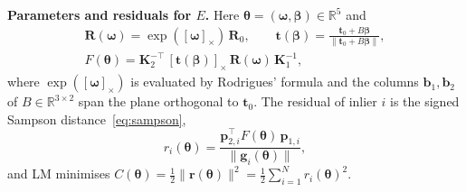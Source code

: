 \documentclass[10pt,a4paper,twocolumn]{article}
\newcommand{\R}{\mathbf{R}}
\newcommand{\tv}{\mathbf{t}}
\newcommand{\K}{\mathbf{K}}
\begin{document}
\textbf{Parameters and residuals for $E$.} Here $\boldsymbol\theta=(\boldsymbol\omega,\boldsymbol\beta)\in\mathbb{R}^5$ and
\begin{gather}
  \R(\boldsymbol\omega)=\exp([\boldsymbol\omega]_\times)\,\R_0,\qquad \tv(\boldsymbol\beta)=\frac{\tv_0+B\boldsymbol\beta}{\|\tv_0+B\boldsymbol\beta\|},\\
  F(\boldsymbol\theta)=\K_2^{-\top}\,[\tv(\boldsymbol\beta)]_\times\,\R(\boldsymbol\omega)\,\K_1^{-1},
\end{gather}
where $\exp([\boldsymbol\omega]_\times)$ is evaluated by Rodrigues' formula and the columns $\mathbf{b}_1,\mathbf{b}_2$ of $B\in\mathbb{R}^{3\times2}$ span the plane orthogonal to $\tv_0$. The residual of inlier $i$ is the signed Sampson distance~\eqref{eq:sampson},
\begin{equation}
  r_i(\boldsymbol\theta)=\frac{\mathbf{p}_{2,i}^\top F(\boldsymbol\theta)\,\mathbf{p}_{1,i}}{\|\mathbf{g}_i(\boldsymbol\theta)\|},
\end{equation}
and LM minimises $C(\boldsymbol\theta)=\tfrac12\|\mathbf{r}(\boldsymbol\theta)\|^2=\tfrac12\sum_{i=1}^N r_i(\boldsymbol\theta)^2$.
\end{document}
